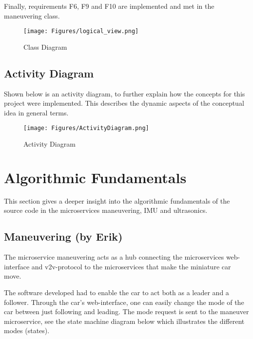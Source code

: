 \documentclass[12pt]{article}
\begin{document}
Finally, requirements F6, F9 and F10 are implemented and met in the maneuvering class. 

\FloatBarrier %
\begin{figure}[ht!]
\centering
\texttt{[image: Figures/logical\_view.png]}
\caption{Class Diagram}
\label{fig:logical_view}
\end{figure}
\FloatBarrier %
\subsection{Activity Diagram}   
Shown below is an activity diagram, to further explain how the concepts for this project were implemented. This describes the dynamic aspects of the conceptual idea in general terms. 

\FloatBarrier %
\begin{figure}[H]
\centering
\texttt{[image: Figures/ActivityDiagram.png]}
\caption{Activity Diagram}
\label{fig:activitydiagram}
\end{figure}
\FloatBarrier %
\pagebreak

\section{Algorithmic Fundamentals}\label{algorithmic fundamentals}
This section gives a deeper insight into the algorithmic fundamentals of the source code in the microservices maneuvering, IMU and ultrasonics.

\subsection{Maneuvering (by Erik)} \label{Maneuvering}
The microservice maneuvering acts as a hub connecting the microservices web-interface and v2v-protocol to the microservices that make the miniature car move. 
\par

The software developed had to enable the car to act both as a leader and a follower. Through the car’s web-interface, one can easily change the mode of the car between just following and leading. The mode request is sent to the maneuver microservice, see the state machine diagram below which illustrates the different modes (states).
\end{document}
